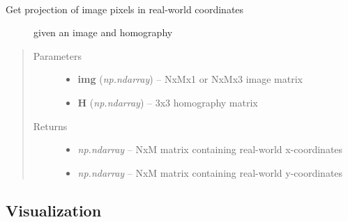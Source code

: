 \documentclass[letterpaper,10pt,english]{sphinxmanual}
\begin{document}
\begin{fulllineitems}
\label{rectification:flamingo.rectification.rectification.rectify_image}~\begin{description}
\item[{Get projection of image pixels in real-world coordinates}] \leavevmode
given an image and homography

\end{description}
\begin{quote}\begin{description}
\item[{Parameters}] \leavevmode\begin{itemize}
\item {} 
\textbf{img} (\emph{np.ndarray}) -- NxMx1 or NxMx3 image matrix

\item {} 
\textbf{H} (\emph{np.ndarray}) -- 3x3 homography matrix

\end{itemize}

\item[{Returns}] \leavevmode
\begin{itemize}
\item {} 
\emph{np.ndarray} --
NxM matrix containing real-world x-coordinates

\item {} 
\emph{np.ndarray} --
NxM matrix containing real-world y-coordinates

\end{itemize}


\end{description}\end{quote}

\end{fulllineitems}



\subsection{Visualization}
\label{rectification:visualization}\label{rectification:module-flamingo.rectification.plot}
\end{document}
